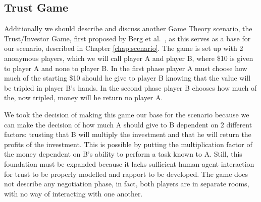 \subsection{Trust Game}
Additionally we should describe and discuss another Game Theory scenario, the Trust/Investor Game, first proposed by Berg et al.~\cite{JoyceBergJohnDickhaut}, as this serves as a base for our scenario, described in Chapter \ref{chap:scenario}. The game is set up with 2 anonymous players, which we will call player A and player B, where \$10 is given to player A and none to player B. In the first phase player A must choose how much of the starting \$10 should he give to player B knowing that the value will be tripled in player B’s hands. In the second phase player B chooses how much of the, now tripled, money will he return no player A.

We took the decision of making this game our base for the scenario because we can make the decision of how much A should give to B dependent on 2 different factors: trusting that B will multiply the investment and that he will return the profits of the investment. This is possible by putting the multiplication factor of the money dependent on B's ability to perform a task known to A.
Still, this foundation must be expanded because it lacks sufficient human-agent interaction for trust to be properly modelled and rapport to be developed. The game does not describe any negotiation phase, in fact, both players are in separate rooms, with no way of interacting with one another.
